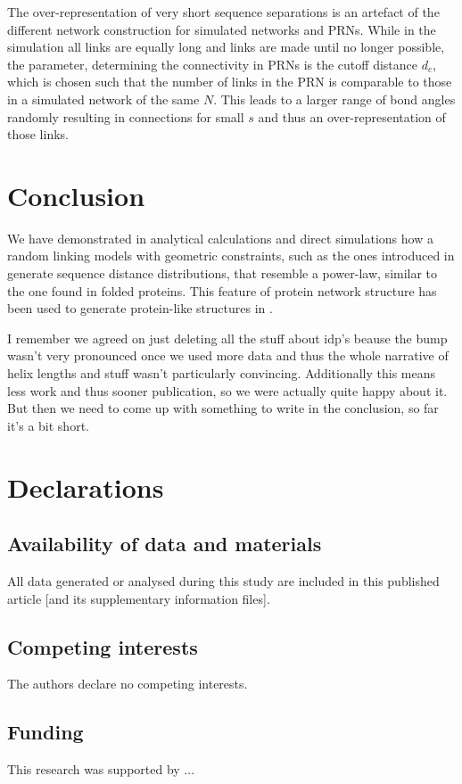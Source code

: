 \documentclass[
reprint,
twocolumn,
amsmath,amssymb,superscriptaddress,aps,
pre]{revtex4-1}
\newcommand{\red}[1]{\textcolor{red!80!black}{#1}}
\begin{document}
The over-representation of very short sequence separations is an artefact of the different network construction for simulated networks and PRNs. While in the simulation all links are equally long and links are made until no longer possible, the parameter, determining the connectivity in PRNs is the cutoff distance $d_c$, which is chosen such that the number of links in the PRN is comparable to those in a simulated network of the same $N$. This leads to a larger range of bond angles randomly resulting in connections for small $s$ and thus an over-representation of those links.

\section*{Conclusion}
We have demonstrated in analytical calculations and direct simulations how a random linking models with geometric constraints, such as the ones introduced in \cite{molkenthin2016scaling, molkenthin2020self} generate sequence distance distributions, that resemble a power-law, similar to the one found in folded proteins. This feature of protein network structure has been used to generate protein-like structures in \cite{bartoli2008effect}.

\red{I remember we agreed on just deleting all the stuff about idp's beause the bump wasn't very pronounced once we used more data and thus the whole narrative of helix lengths and stuff wasn't particularly convincing. Additionally this means less work and thus sooner publication, so we were actually quite happy about it. But then we need to come up with something to write in the conclusion, so far it's a bit short.}

\section*{Declarations}
\subsection{Availability of data and materials}
All data generated or analysed during this study are included in this published article [and its supplementary information files].
\subsection{Competing interests}
The authors declare no competing interests.
\subsection{Funding}
This research was supported by ...
\end{document}
